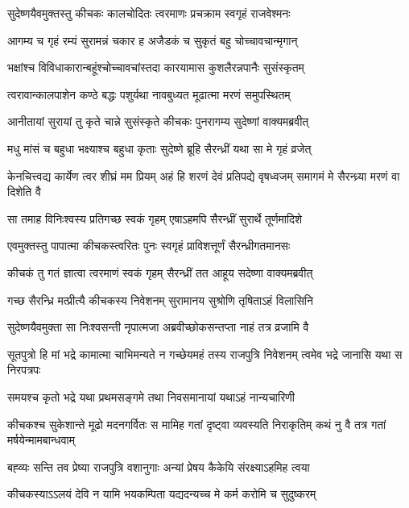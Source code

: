 
\twolineshloka
{सुदेष्णयैवमुक्तस्तु कीचकः कालचोदितः}
{त्वरमाणः प्रचक्राम स्वगृहं राजवेश्मनः}


\twolineshloka
{आगम्य च गृहं रम्यं सुरामन्नं चकार ह}
{अजैडकं च सुकृतं बहु चोच्चावचान्मृगान्}


\twolineshloka
{भक्षांश्च विविधाकारान्बहूंश्चोच्चावचांस्तदा}
{कारयामास कुशलैरन्नपानैः सुसंस्कृतम्}


\twolineshloka
{त्वरावान्कालपाशेन कण्ठे बद्धः पशुर्यथा}
{नावबुध्यत मूढात्मा मरणं समुपस्थितम्}


\twolineshloka
{आनीतायां सुरायां तु कृते चान्ने सुसंस्कृते}
{कीचकः पुनरागम्य सुदेष्णां वाक्यमब्रवीत्}


\twolineshloka
{मधु मांसं च बहुधा भक्ष्याश्च बहुधा कृताः}
{सुदेष्णे ब्रूहि सैरन्ध्रीं यथा सा मे गृहं व्रजेत्}


\threelineshloka
{केनचित्त्वद्य कार्येण त्वर शीघ्रं मम प्रियम्}
{अहं हि शरणं देवं प्रतिपद्ये वृषध्वजम्}
{समागमं मे सैरन्ध्र्या मरणं वा दिशेति वै}



\twolineshloka
{सा तमाह विनिःश्वस्य प्रतिगच्छ स्वकं गृहम्}
{एषाऽहमपि सैरन्ध्रीं सुरार्थे तूर्णमादिशे}


\twolineshloka
{एवमुक्तस्तु पापात्मा कीचकस्त्वरितः पुनः}
{स्वगृहं प्राविशत्तूर्णं सैरन्ध्रीगतमानसः}


\twolineshloka
{कीचकं तु गतं ज्ञात्वा त्वरमाणं स्वकं गृहम्}
{सैरन्ध्रीं तत आहूय सदेष्णा वाक्यमब्रवीत्}


\twolineshloka
{गच्छ सैरन्ध्रि मत्प्रीत्यै कीचकस्य निवेशनम्}
{सुरामानय सुश्रोणि तृषिताऽहं विलासिनि}



\twolineshloka
{सुदेष्णयैवमुक्ता सा निःश्वसन्ती नृपात्मजा}
{अब्रवीच्छोकसन्तप्ता नाहं तत्र व्रजामि वै}


\threelineshloka
{सूतपुत्रो हि मां भद्रे कामात्मा चाभिमन्यते}
{न गच्छेयमहं तस्य राजपुत्रि निवेशनम्}
{त्वमेव भद्रे जानासि यथा स निरपत्रपः}


\twolineshloka
{समयश्च कृतो भद्रे यथा प्रथमसङ्गमे}
{तथा निवसमानायां यथाऽहं नान्यचारिणी}


\threelineshloka
{कीचकश्च सुकेशान्ते मूढो मदनगर्वितः}
{स मामिह गतां दृष्ट्वा व्यवस्यति निराकृतिम्}
{कथं नु वै तत्र गतां मर्षयेन्मामबान्धवाम्}


\twolineshloka
{बह्व्यः सन्ति तव प्रेष्या राजपुत्रि वशानुगाः}
{अन्यां प्रेषय कैकेयि संरक्ष्याऽहमिह त्वया}


\twolineshloka
{कीचकस्याऽऽलयं देवि न यामि भयकम्पिता}
{यद्यदन्यच्च मे कर्म करोमि च सुदुष्करम्}


